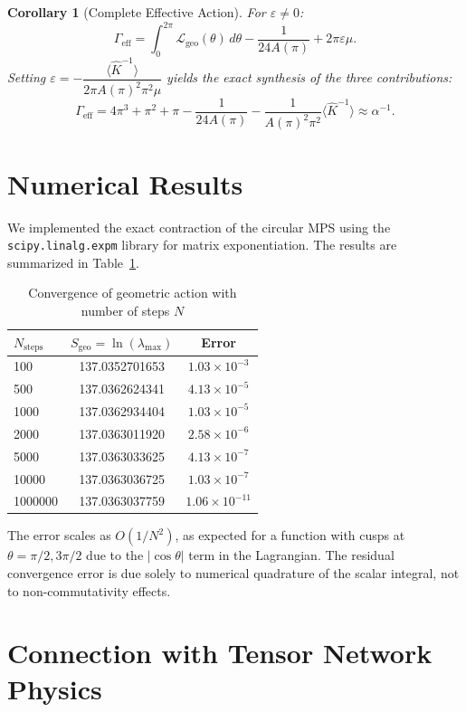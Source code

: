 \documentclass[12pt]{article}
\newtheorem{corollary}{Corollary}
\begin{document}
\begin{corollary}[Complete Effective Action]
For $\varepsilon \neq 0$:
\[
\Gamma_{\text{eff}} = \int_0^{2\pi} \mathcal{L}_{\text{geo}}(\theta) \, d\theta
- \frac{1}{24A(\pi)} + 2\pi \varepsilon \mu.
\]
Setting $\varepsilon = -\dfrac{\langle \hat K^{-1} \rangle}{2\pi A(\pi)^2 \pi^2 \mu}$ yields
the exact synthesis of the three contributions:
\[
\Gamma_{\text{eff}} = 4\pi^3 + \pi^2 + \pi - \frac{1}{24A(\pi)}
- \frac{1}{A(\pi)^2 \pi^2} \langle \hat K^{-1} \rangle \approx \alpha^{-1}.
\]
\end{corollary}

\section{Numerical Results}

We implemented the exact contraction of the circular MPS using the
\texttt{scipy.linalg.expm} library for matrix exponentiation. The results are summarized
in Table~\ref{tab:convergence}.

\begin{table}[h]
\centering
\caption{Convergence of geometric action with number of steps $N$}
\label{tab:convergence}
\begin{tabular}{lcc}
\toprule
$N_{\text{steps}}$ & $S_{\text{geo}} = \ln(\lambda_{\max})$ & Error \\
\midrule
100     & 137.0352701653 & $1.03\times10^{-3}$ \\
500     & 137.0362624341 & $4.13\times10^{-5}$ \\
1000    & 137.0362934404 & $1.03\times10^{-5}$ \\
2000    & 137.0363011920 & $2.58\times10^{-6}$ \\
5000    & 137.0363033625 & $4.13\times10^{-7}$ \\
10000   & 137.0363036725 & $1.03\times10^{-7}$ \\
1000000 & 137.0363037759 & $1.06\times10^{-11}$ \\
\bottomrule
\end{tabular}
\end{table}

The error scales as $O(1/N^2)$, as expected for a function with cusps at
$\theta = \pi/2, 3\pi/2$ due to the $|\cos\theta|$ term in the Lagrangian. The residual
convergence error is due solely to numerical quadrature of the scalar integral, not
to non-commutativity effects.

\section{Connection with Tensor Network Physics}
\end{document}
